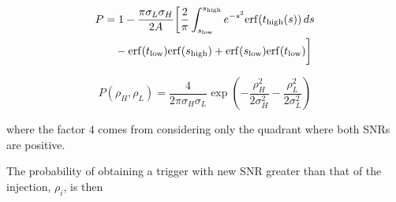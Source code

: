 \begin{align*}
P &= 1 - \frac{\pi\sigma_L \sigma_H}{2 A} \bigg[
\frac{2}{\pi} \int_{s_{\mathrm{low}}}^{s_{\mathrm{high}}} e^{-s^2}
\mathrm{erf}(t_{\mathrm{high}}(s))\,ds \nonumber \\
&\quad - \mathrm{erf}(t_{\mathrm{low}}) \mathrm{erf}(s_{\mathrm{high}})  
+ \mathrm{erf}(s_{\mathrm{low}}) \mathrm{erf} (t_{\mathrm{low}}) \bigg] \\
\end{align*}


\iffalse
\begin{equation}
P(\rho_H,\rho_L) = 
\frac{4}{2\pi \sigma_H \sigma_L} 
\exp\left(
-\frac{\rho_H^2}{2\sigma_H^2} -\frac{\rho_L^2}{2\sigma_L^2}
\right)
\end{equation}

where the factor $4$ comes from considering only the quadrant where
both SNRs are positive.

The probability of obtaining a trigger with new SNR greater than
that of the injection, $\rho_i$, is then

